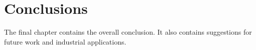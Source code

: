 % 
% 

\chapter{Conclusions}
\label{cha:conclusion}
The final chapter contains the overall conclusion. It also contains
suggestions for future work and industrial applications.





